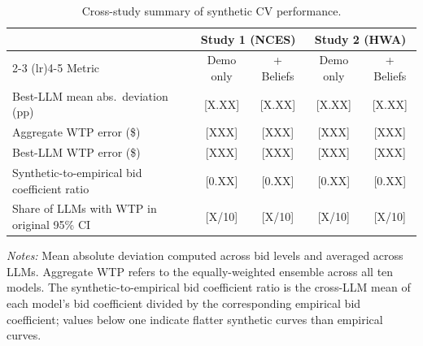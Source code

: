 \documentclass[12pt]{article}
\begin{document}
\begin{table}[h]
    \centering
    \caption{Cross-study summary of synthetic CV performance.}
    \label{tab:cross-study}
    \begin{threeparttable}
    \begin{tabular}{lcccc}
        \toprule
         & \multicolumn{2}{c}{Study 1 (NCES)} & \multicolumn{2}{c}{Study 2 (HWA)} \\
        \cmidrule(lr){2-3} \cmidrule(lr){4-5}
        Metric & Demo only & + Beliefs & Demo only & + Beliefs \\
        \midrule
        Best-LLM mean abs.\ deviation (pp)              & [X.XX] & [X.XX] & [X.XX] & [X.XX] \\
        Aggregate WTP error (\$)                        & [XXX]  & [XXX]  & [XXX]  & [XXX]  \\
        Best-LLM WTP error (\$)                         & [XXX]  & [XXX]  & [XXX]  & [XXX]  \\
        Synthetic-to-empirical bid coefficient ratio   & [0.XX] & [0.XX] & [0.XX] & [0.XX] \\
        Share of LLMs with WTP in original 95\% CI      & [X/10] & [X/10] & [X/10] & [X/10] \\
        \bottomrule
    \end{tabular}
    \begin{tablenotes}\footnotesize
    \item \textit{Notes:} Mean absolute deviation computed across bid
    levels and averaged across LLMs. Aggregate WTP refers to the
    equally-weighted ensemble across all ten models. The
    synthetic-to-empirical bid coefficient ratio is the cross-LLM mean of
    each model's bid coefficient divided by the corresponding empirical
    bid coefficient; values below one indicate flatter synthetic curves
    than empirical curves.
    \end{tablenotes}
    \end{threeparttable}
\end{table}


%
\end{document}
